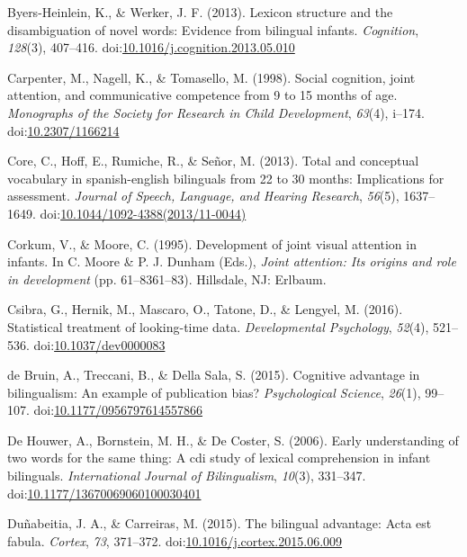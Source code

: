 \documentclass[,man,floatsintext]{apa6}
\begin{document}
\leavevmode\hypertarget{ref-Byers-Heinlein_Werker_2013}{}%
Byers-Heinlein, K., \& Werker, J. F. (2013). Lexicon structure and the disambiguation of novel words: Evidence from bilingual infants. \emph{Cognition}, \emph{128}(3), 407--416. doi:\href{https://doi.org/10.1016/j.cognition.2013.05.010}{10.1016/j.cognition.2013.05.010}

\leavevmode\hypertarget{ref-Carpenter_etal_1998}{}%
Carpenter, M., Nagell, K., \& Tomasello, M. (1998). Social cognition, joint attention, and communicative competence from 9 to 15 months of age. \emph{Monographs of the Society for Research in Child Development}, \emph{63}(4), i--174. doi:\href{https://doi.org/10.2307/1166214}{10.2307/1166214}

\leavevmode\hypertarget{ref-Core_etal_2013}{}%
Core, C., Hoff, E., Rumiche, R., \& Señor, M. (2013). Total and conceptual vocabulary in spanish-english bilinguals from 22 to 30 months: Implications for assessment. \emph{Journal of Speech, Language, and Hearing Research}, \emph{56}(5), 1637--1649. doi:\href{https://doi.org/10.1044/1092-4388(2013/11-0044)}{10.1044/1092-4388(2013/11-0044)}

\leavevmode\hypertarget{ref-Corkum_Moore_1995}{}%
Corkum, V., \& Moore, C. (1995). Development of joint visual attention in infants. In C. Moore \& P. J. Dunham (Eds.), \emph{Joint attention: Its origins and role in development} (pp. 61--8361--83). Hillsdale, NJ: Erlbaum.

\leavevmode\hypertarget{ref-Csibra_etal_2016}{}%
Csibra, G., Hernik, M., Mascaro, O., Tatone, D., \& Lengyel, M. (2016). Statistical treatment of looking-time data. \emph{Developmental Psychology}, \emph{52}(4), 521--536. doi:\href{https://doi.org/10.1037/dev0000083}{10.1037/dev0000083}

\leavevmode\hypertarget{ref-deBruin_etal_2015}{}%
de Bruin, A., Treccani, B., \& Della Sala, S. (2015). Cognitive advantage in bilingualism: An example of publication bias? \emph{Psychological Science}, \emph{26}(1), 99--107. doi:\href{https://doi.org/10.1177/0956797614557866}{10.1177/0956797614557866}

\leavevmode\hypertarget{ref-DeHouwer_etal_2006}{}%
De Houwer, A., Bornstein, M. H., \& De Coster, S. (2006). Early understanding of two words for the same thing: A cdi study of lexical comprehension in infant bilinguals. \emph{International Journal of Bilingualism}, \emph{10}(3), 331--347. doi:\href{https://doi.org/10.1177/13670069060100030401}{10.1177/13670069060100030401}

\leavevmode\hypertarget{ref-Dunabeitia_Carreiras_2015}{}%
Duñabeitia, J. A., \& Carreiras, M. (2015). The bilingual advantage: Acta est fabula. \emph{Cortex}, \emph{73}, 371--372. doi:\href{https://doi.org/10.1016/j.cortex.2015.06.009}{10.1016/j.cortex.2015.06.009}
\end{document}
